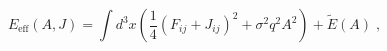 \begin{equation}
E_{\mathrm{eff}}(A,J)=\int d^{3}x\left( \frac{1}{4}\left(
F_{ij}+J_{ij}\right) ^{2}+\sigma ^{2}q^{2}A^{2}\right) +\widetilde{E}(A)\;,
\label{effg}
\end{equation}

